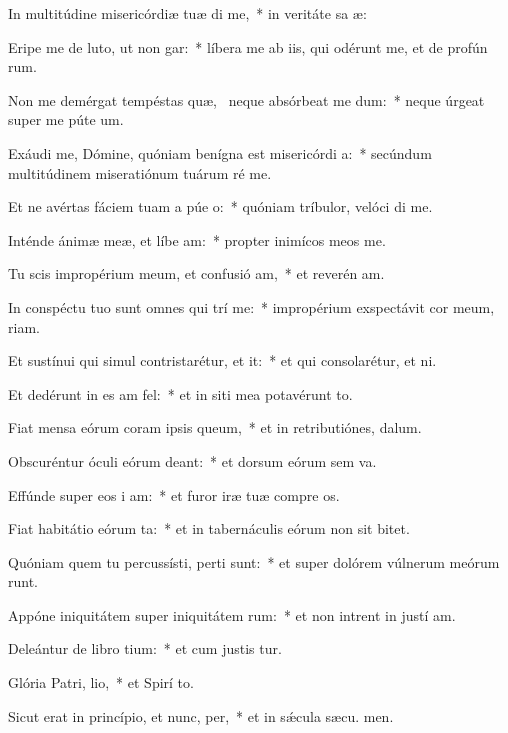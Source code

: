 \item In multitúdine misericórdiæ tuæ di me,~* in veritáte sa æ:
\item Eripe me de luto, ut non gar:~* líbera me ab iis, qui odérunt me, et de profún rum.
\item Non me demérgat tempéstas quæ,~\pscross{} neque absórbeat me dum:~* neque úrgeat super me púte  um.
\item Exáudi me, Dómine, quóniam benígna est misericórdi a:~* secúndum multitúdinem miseratiónum tuárum ré  me.
\item Et ne avértas fáciem tuam a púe o:~* quóniam tríbulor, velóci di me.
\item Inténde ánimæ meæ, et líbe am:~* propter inimícos meos  me.
\item Tu scis impropérium meum, et confusió am,~* et reverén am.
\item In conspéctu tuo sunt omnes qui trí me:~* impropérium exspectávit cor meum,  riam.
\item Et sustínui qui simul contristarétur, et  it:~* et qui consolarétur, et  ni.
\item Et dedérunt in es am fel:~* et in siti mea potavérunt  to.
\item Fiat mensa eórum coram ipsis  queum,~* et in retributiónes,   dalum.
\item Obscuréntur óculi eórum  deant:~* et dorsum eórum sem va.
\item Effúnde super eos i am:~* et furor iræ tuæ compre os.
\item Fiat habitátio eórum ta:~* et in tabernáculis eórum non sit  bitet.
\item Quóniam quem tu percussísti, perti sunt:~* et super dolórem vúlnerum meórum runt.
\item Appóne iniquitátem super iniquitátem rum:~* et non intrent in justí am.
\item Deleántur de libro tium:~* et cum justis  tur.
\item Glória Patri,  lio,~* et Spirí to.
\item Sicut erat in princípio, et nunc,  per,~* et in sǽcula sæcu. men.
